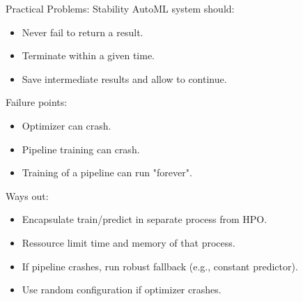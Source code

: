 	\begin{frame}{Practical Problems: Stability}
		AutoML system should: 
		\begin{itemize}
			\item Never fail to return a result.
			\item Terminate within a given time.
			\item Save intermediate results and allow to continue.
		\end{itemize}

		Failure points:
		\begin{itemize}
			\item Optimizer can crash.
			\item Pipeline training can crash.
			\item Training of a pipeline can run "forever". 
		\end{itemize}

		Ways out:
		\begin{itemize}
			\item Encapsulate train/predict in separate process from HPO.
			\item Ressource limit time and memory of that process.
			\item If pipeline crashes, run robust fallback (e.g., constant predictor).   
			\item Use random configuration if optimizer crashes.
		\end{itemize}
		
	\end{frame}
	
